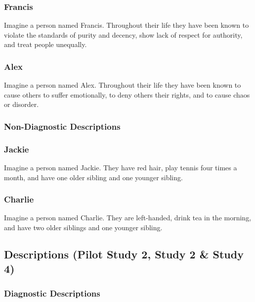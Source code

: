 \documentclass[
  american,
  man,floatsintext]{apa7}
\begin{document}
\hypertarget{francis}{%
\subsubsection{Francis}\label{francis}}

Imagine a person named Francis.
Throughout their life they have been known to violate the standards of purity and decency, show lack of respect for authority, and treat people unequally.

\hypertarget{alex}{%
\subsubsection{Alex}\label{alex}}

Imagine a person named Alex.
Throughout their life they have been known to cause others to suffer emotionally, to deny others their rights, and to cause chaos or disorder.

\hypertarget{non-diagnostic-descriptions}{%
\subsubsection{Non-Diagnostic Descriptions}\label{non-diagnostic-descriptions}}

\hypertarget{jackie}{%
\subsubsection{Jackie}\label{jackie}}

Imagine a person named Jackie.
They have red hair, play tennis four times a month, and have one older sibling and one younger sibling.

\hypertarget{charlie}{%
\subsubsection{Charlie}\label{charlie}}

Imagine a person named Charlie.
They are left-handed, drink tea in the morning, and have two older siblings and one younger sibling.

\hypertarget{descriptions-pilot-study-2-study-2-study-4}{%
\subsection{Descriptions (Pilot Study 2, Study 2 \& Study 4)}\label{descriptions-pilot-study-2-study-2-study-4}}

\hypertarget{diagnostic-descriptions-1}{%
\subsubsection{Diagnostic Descriptions}\label{diagnostic-descriptions-1}}
\end{document}

